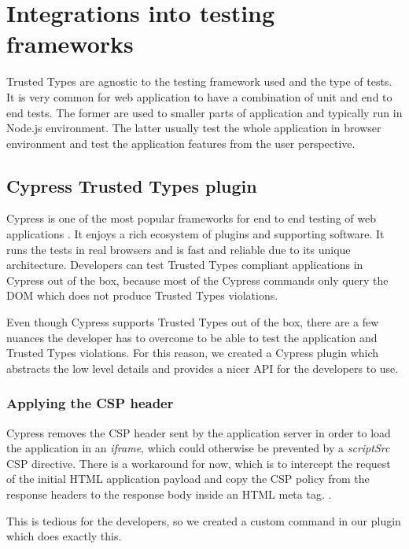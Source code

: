 \chapter{Integrations into testing frameworks}


Trusted Types are agnostic to the testing framework used and the type of tests. It is very common
for web application to have a combination of unit and end to end tests. The former are used to
smaller parts of application and typically run in Node.js environment. The latter usually test the
whole application in browser environment and test the application features from the user
perspective.

\section{Cypress Trusted Types plugin}
\label{cypress_testing_plugin}

Cypress is one of the most popular frameworks for end to end testing of web applications
\cite{js_state:testing}. It enjoys a rich ecosystem of plugins and supporting software. It runs the
tests in real browsers and is fast and reliable due to its unique architecture. Developers can test
Trusted Types compliant applications in Cypress out of the box, because most of the Cypress commands
only query the DOM which does not produce Trusted Types violations.

Even though Cypress supports Trusted Types out of the box, there are a few
nuances the developer has to overcome to be able to test the application and Trusted Types
violations. For this reason, we created a Cypress plugin which abstracts the low level details
and provides a nicer API for the developers to use.

\subsection{Applying the CSP header}

Cypress removes the CSP header sent by the application server in order to load the application in an
\emph{iframe}, which could otherwise be prevented by a \emph{scriptSrc} CSP directive. There is a
workaround for now, which is to intercept the request of the initial HTML application payload and
copy the CSP policy from the response headers to the response body inside an HTML meta tag.
\cite{cypress:csp_removal_issue}.

This is tedious for the developers, so we created a custom command in our plugin which does
exactly this.


